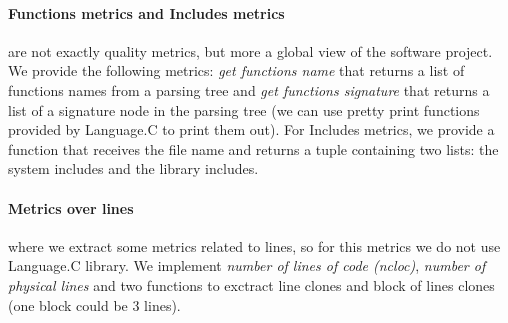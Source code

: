 \paragraph{Functions metrics and Includes metrics} are not exactly quality metrics, but more a global view of the software project. We provide the following metrics:
\textit{get functions name} that returns a list of functions names from a parsing tree and \textit{get functions signature} that returns a list of a signature node in the
parsing tree (we can use pretty print functions provided by Language.C to print them out). For Includes metrics, we provide a function that receives the file name and
returns a tuple containing two lists: the system includes and the library includes.
\paragraph{Metrics over lines} where we extract some metrics related to lines, so for this metrics we do not use Language.C library.
We implement \textit{number of lines of code (ncloc)}, \textit{number of physical lines} and two functions to exctract line clones and block of lines clones (one block
could be 3 lines).


